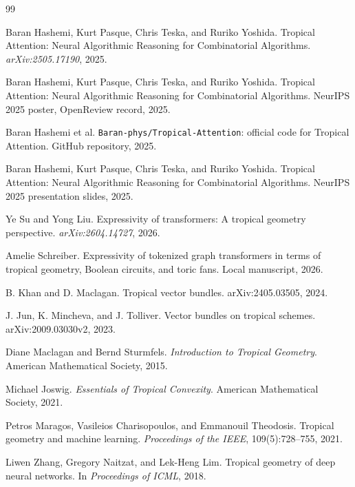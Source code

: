\documentclass[11pt]{article}
\begin{document}
\begin{thebibliography}{99}

Baran Hashemi, Kurt Pasque, Chris Teska, and Ruriko Yoshida.
\newblock Tropical Attention: Neural Algorithmic Reasoning for Combinatorial Algorithms.
\newblock \emph{arXiv:2505.17190}, 2025.

Baran Hashemi, Kurt Pasque, Chris Teska, and Ruriko Yoshida.
\newblock Tropical Attention: Neural Algorithmic Reasoning for Combinatorial Algorithms.
\newblock NeurIPS 2025 poster, OpenReview record, 2025.

Baran Hashemi et al.
\newblock \texttt{Baran-phys/Tropical-Attention}: official code for Tropical Attention.
\newblock GitHub repository, 2025.

Baran Hashemi, Kurt Pasque, Chris Teska, and Ruriko Yoshida.
\newblock Tropical Attention: Neural Algorithmic Reasoning for Combinatorial Algorithms.
\newblock NeurIPS 2025 presentation slides, 2025.

Ye Su and Yong Liu.
\newblock Expressivity of transformers: A tropical geometry perspective.
\newblock \emph{arXiv:2604.14727}, 2026.

Amelie Schreiber.
\newblock Expressivity of tokenized graph transformers in terms of tropical geometry, Boolean circuits, and toric fans.
\newblock Local manuscript, 2026.


B. Khan and D. Maclagan.
\newblock Tropical vector bundles.
\newblock arXiv:2405.03505, 2024.

J. Jun, K. Mincheva, and J. Tolliver.
\newblock Vector bundles on tropical schemes.
\newblock arXiv:2009.03030v2, 2023.

Diane Maclagan and Bernd Sturmfels.
\newblock \emph{Introduction to Tropical Geometry}.
\newblock American Mathematical Society, 2015.

Michael Joswig.
\newblock \emph{Essentials of Tropical Convexity}.
\newblock American Mathematical Society, 2021.

Petros Maragos, Vasileios Charisopoulos, and Emmanouil Theodosis.
\newblock Tropical geometry and machine learning.
\newblock \emph{Proceedings of the IEEE}, 109(5):728--755, 2021.

Liwen Zhang, Gregory Naitzat, and Lek-Heng Lim.
\newblock Tropical geometry of deep neural networks.
\newblock In \emph{Proceedings of ICML}, 2018.


\end{thebibliography}
\end{document}
